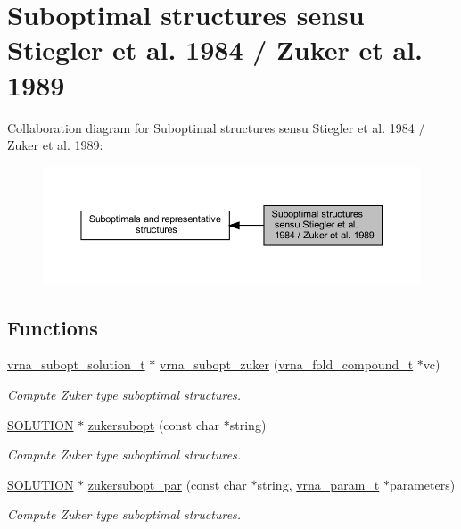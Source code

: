 \hypertarget{group__subopt__zuker}{}\section{Suboptimal structures sensu Stiegler et al. 1984 / Zuker et al. 1989}
\label{group__subopt__zuker}
Collaboration diagram for Suboptimal structures sensu Stiegler et al. 1984 / Zuker et al. 1989\+:
\nopagebreak
\begin{figure}[H]
\begin{center}
\leavevmode
\includegraphics[width=350pt]{group__subopt__zuker}
\end{center}
\end{figure}
\subsection*{Functions}
\begin{DoxyCompactItemize}
\item 
\hyperlink{subopt_8h_a01ae9a0f27d245d89f705afd843fc457}{vrna\+\_\+subopt\+\_\+solution\+\_\+t} $\ast$ \hyperlink{group__subopt__zuker_gababde9d210eb433854f1e71da7815fbb}{vrna\+\_\+subopt\+\_\+zuker} (\hyperlink{group__fold__compound_ga1b0cef17fd40466cef5968eaeeff6166}{vrna\+\_\+fold\+\_\+compound\+\_\+t} $\ast$vc)
\begin{DoxyCompactList}\small\item\em Compute Zuker type suboptimal structures. \end{DoxyCompactList}\item 
\hyperlink{subopt_8h_aa0f46ff02e1017469cf902d02ecd7f9a}{S\+O\+L\+U\+T\+I\+ON} $\ast$ \hyperlink{group__subopt__zuker_ga0d5104e3ecf119d8eabd40aa5fe47f90}{zukersubopt} (const char $\ast$string)
\begin{DoxyCompactList}\small\item\em Compute Zuker type suboptimal structures. \end{DoxyCompactList}\item 
\hyperlink{subopt_8h_aa0f46ff02e1017469cf902d02ecd7f9a}{S\+O\+L\+U\+T\+I\+ON} $\ast$ \hyperlink{group__subopt__zuker_gab6d0ea8cc1d02f6dd831ca81043c9eb8}{zukersubopt\+\_\+par} (const char $\ast$string, \hyperlink{group__energy__parameters_ga8a69ca7d787e4fd6079914f5343a1f35}{vrna\+\_\+param\+\_\+t} $\ast$parameters)
\begin{DoxyCompactList}\small\item\em Compute Zuker type suboptimal structures. \end{DoxyCompactList}\end{DoxyCompactItemize}


